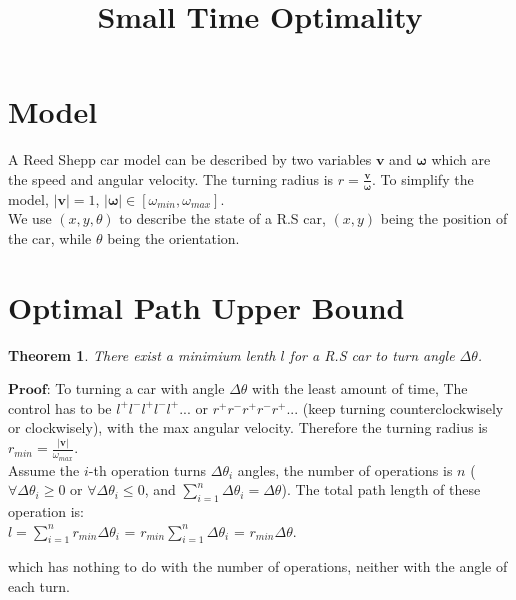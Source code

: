 \documentclass[12pt]{article}
\title{Small Time Optimality}
\date{}
\newtheorem{theorem}{Theorem}[section]
\begin{document}
  \maketitle
  \section{Model}
	A Reed Shepp car model can be described by two variables $\boldsymbol{v}$ and $\boldsymbol{\omega}$ which are the speed and angular velocity. The turning radius is $r=\frac{ \boldsymbol{v} }{ \boldsymbol{\omega} }$. To simplify the model, $|\boldsymbol{v}|=1$, $|\boldsymbol{\omega}| \in [ \omega_{min}, \omega_{max}]$.\\
	
	We use $(x,y,\theta)$ to describe the state of a R.S car, $(x,y)$ being the position of the car, while $\theta$ being the orientation.
  
  \section{Optimal Path Upper Bound}
  \begin{theorem}
  	There exist a minimium lenth $l$ for a R.S car to turn angle $\Delta\theta$. 
  \end{theorem}
  
  $\textbf{Proof}$: To turning a car with angle $\Delta\theta$ with the least amount of time, The control has to be $l^{+}l^{-}l^{+}l^{-}l^{+}...$ or $r^{+}r^{-}r^{+}r^{-}r^{+}...$ (keep turning counterclockwisely or clockwisely), with the max angular velocity. Therefore the turning radius is $r_{min}=\frac{ |\boldsymbol{v}| }{\omega_{max} }$.\\ 
  
  Assume the $i$-th operation turns $\Delta\theta_{i}$ angles, the number of operations is $n$ ($\forall{\Delta\theta_{i}} \geq 0$ or $\forall{\Delta\theta_{i}} \leq 0$, and $\sum_{i=1}^{n}\Delta\theta_{i} = \Delta\theta$). The total path length of these operation is:\\
  
  $l = \sum_{i=1}^{n}r_{min}\Delta\theta_{i}$ = $r_{min}\sum_{i=1}^{n}\Delta\theta_{i}$ = $r_{min}\Delta\theta$.

  which has nothing to do with the number of operations, neither with the angle of each turn.  
  
\end{document}
